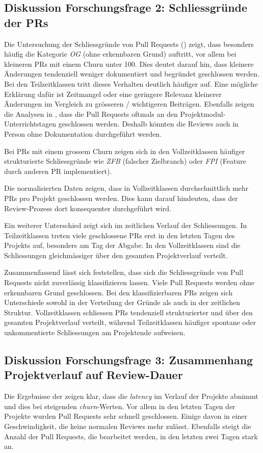 \subsection{Diskussion Forschungsfrage 2: Schliessgründe der PRs}
Die Untersuchung der Schliessgründe von Pull Requests () zeigt, dass besonders häufig die Kategorie \textit{OG} (ohne erkennbaren Grund) auftritt, vor allem bei kleineren PRs mit einem Churn unter 100. Dies deutet darauf hin, dass kleinere Änderungen tendenziell weniger dokumentiert und begründet geschlossen werden. \\
Bei den  Teilzeitklassen tritt dieses Verhalten deutlich häufiger auf. Eine mögliche Erklärung dafür ist Zeitmangel oder eine geringere Relevanz kleinerer Änderungen im Vergleich zu grösseren / wichtigeren Beiträgen. Ebenfalls zeigen die Analysen in , dass die Pull Requests oftmals an den Projektmodul-Unterrichtstagen geschlossen werden. Deshalb könnten die Reviews auch in Person ohne Dokumentation durchgeführt werden. 

Bei PRs mit einem grossem Churn zeigen sich in den Vollzeitklassen häufiger strukturierte Schliessgründe wie \textit{ZFB} (falscher Zielbranch) oder \textit{FPI} (Feature durch anderen PR implementiert).

Die normalisierten Daten zeigen, dass in Vollzeitklassen durchschnittlich mehr PRs pro Projekt geschlossen werden. Dies kann darauf hindeuten, dass der Review-Prozess dort konsequenter durchgeführt wird.

Ein weiterer Unterschied zeigt sich im zeitlichen Verlauf der Schliessungen. In Teilzeitklassen treten viele geschlossene PRs erst in den letzten Tagen des Projekts auf, besonders am Tag der Abgabe. In den Vollzeitklassen sind die Schliessungen gleichmässiger über den gesamten Projektverlauf verteilt.

Zusammenfassend lässt sich feststellen, dass sich die Schliessgründe von Pull Requests nicht zuverlässig klassifizieren lassen. Viele Pull Requests werden ohne erkennbaren Grund geschlossen. Bei den klassifizierbaren PRs zeigen sich Unterschiede sowohl in der Verteilung der Gründe als auch in der zeitlichen Struktur. Vollzeitklassen schliessen PRs tendenziell strukturierter und über den gesamten Projektverlauf verteilt, während Teilzeitklassen häufiger spontane oder unkommentierte Schliessungen am Projektende aufweisen.


\subsection{Diskussion Forschungsfrage 3: Zusammenhang Projektverlauf auf Review-Dauer}
Die Ergebnisse der  zeigen klar, dass die \textit{latency} im Verlauf der Projekte abnimmt und dies bei steigenden \textit{churn}-Werten. Vor allem in den letzten Tagen der Projekte wurden Pull Requests sehr schnell geschlossen. Einige davon in einer Geschwindigkeit, die keine normalen Reviews mehr zulässt.  Ebenfalls steigt die Anzahl der Pull Requests, die bearbeitet werden, in den letzten zwei Tagen stark an. 

